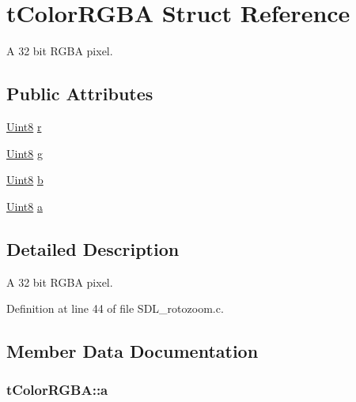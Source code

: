 \hypertarget{structt_color_r_g_b_a}{}\section{t\+Color\+R\+G\+B\+A Struct Reference}
\label{structt_color_r_g_b_a}


A 32 bit R\+G\+B\+A pixel.  


\subsection*{Public Attributes}
\begin{DoxyCompactItemize}
\item 
\hyperlink{_s_d_l__stdinc_8h_a2944638813a090aa23e62f4da842c3e2}{Uint8} \hyperlink{structt_color_r_g_b_a_a96efe754f0357efcfb2fa56447dfb76e}{r}
\item 
\hyperlink{_s_d_l__stdinc_8h_a2944638813a090aa23e62f4da842c3e2}{Uint8} \hyperlink{structt_color_r_g_b_a_a22f3efdc47c67f2672be345f7c7e8cb1}{g}
\item 
\hyperlink{_s_d_l__stdinc_8h_a2944638813a090aa23e62f4da842c3e2}{Uint8} \hyperlink{structt_color_r_g_b_a_ab6aa469c65af3c3bc56dd3657698c3b3}{b}
\item 
\hyperlink{_s_d_l__stdinc_8h_a2944638813a090aa23e62f4da842c3e2}{Uint8} \hyperlink{structt_color_r_g_b_a_a3177aa7ac55c6bdfa6288c6bc5e99628}{a}
\end{DoxyCompactItemize}


\subsection{Detailed Description}
A 32 bit R\+G\+B\+A pixel. 

Definition at line 44 of file S\+D\+L\+\_\+rotozoom.\+c.



\subsection{Member Data Documentation}
\hypertarget{structt_color_r_g_b_a_a3177aa7ac55c6bdfa6288c6bc5e99628}{}
\subsubsection[{a}]{ t\+Color\+R\+G\+B\+A\+::a}\label{structt_color_r_g_b_a_a3177aa7ac55c6bdfa6288c6bc5e99628}


